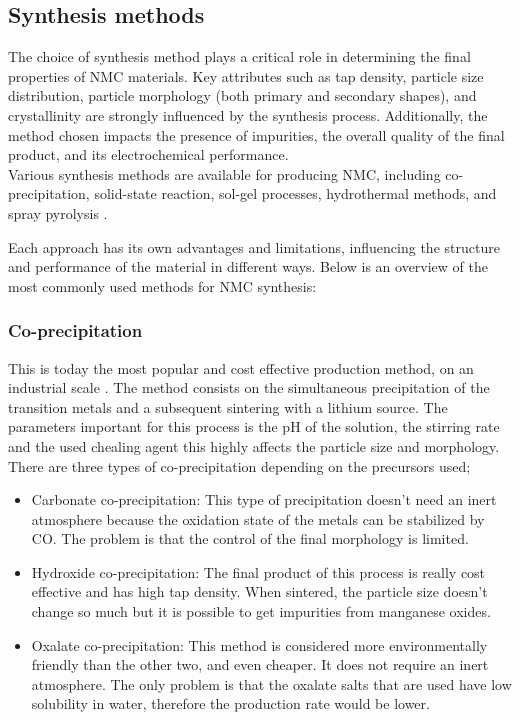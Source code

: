 \documentclass{article}
\begin{document}
\subsection{Synthesis methods}
The choice of synthesis method plays a critical role in determining the final properties of NMC materials. Key attributes such as tap density, particle size distribution, particle morphology (both primary and secondary shapes), and crystallinity are strongly influenced by the synthesis process. Additionally, the method chosen impacts the presence of impurities, the overall quality of the final product, and its electrochemical performance. \\

Various synthesis methods are available for producing NMC, including co-precipitation, solid-state reaction, sol-gel processes, hydrothermal methods, and spray pyrolysis \cite{process}. 

Each approach has its own advantages and limitations, influencing the structure and performance of the material in different ways. Below is an overview of the most commonly used methods for NMC synthesis:
\subsubsection{Co-precipitation}
This is today the most popular and cost effective production method, on an industrial scale
. The method consists on the simultaneous precipitation of the transition metals and a subsequent sintering with
a lithium source. The parameters important for this process is the pH of the solution, the stirring rate 
and the used chealing agent this highly affects the particle size and morphology. \cite{process}  \\
There are three types of co-precipitation depending on the precursors used;
\begin{itemize}
  \item Carbonate co-precipitation: This type of precipitation doesn't need an inert atmosphere
  because the oxidation state of the metals can be stabilized by CO. The problem is that
the control of the final morphology is limited. \cite{process}
  \item Hydroxide co-precipitation: The final product of this process is really
  cost effective and has high tap density. When sintered, the particle size doesn't change
  so much but it is possible to get impurities from manganese oxides.\cite{process}
  \item Oxalate co-precipitation: This method is considered more environmentally
  friendly than the other two, and even cheaper. It does not require an inert 
  atmosphere. The only problem is that the oxalate salts that are used 
  have low solubility in water, therefore the production rate would be lower\cite{process}.
\end{itemize}
\end{document}
